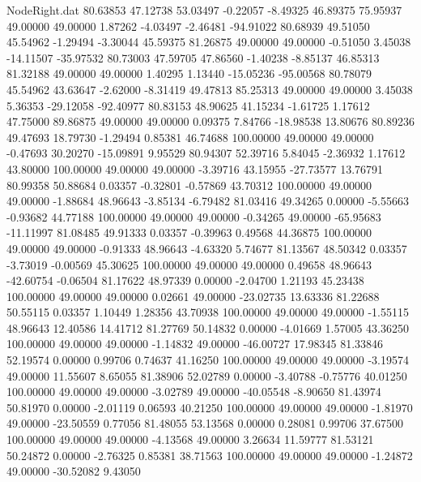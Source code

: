 \begin{filecontents}{NodeRight.dat}
  80.63853   47.12738   53.03497    -0.22057   -8.49325   46.89375   75.95937   49.00000   49.00000    1.87262   -4.03497   -2.46481  -94.91022
  80.68939   49.51050   45.54962    -1.29494   -3.30044   45.59375   81.26875   49.00000   49.00000   -0.51050    3.45038  -14.11507  -35.97532
  80.73003   47.59705   47.86560    -1.40238   -8.85137   46.85313   81.32188   49.00000   49.00000    1.40295    1.13440  -15.05236  -95.00568
  80.78079   45.54962   43.63647    -2.62000   -8.31419   49.47813   85.25313   49.00000   49.00000    3.45038    5.36353  -29.12058  -92.40977
  80.83153   48.90625   41.15234    -1.61725    1.17612   47.75000   89.86875   49.00000   49.00000    0.09375    7.84766  -18.98538   13.80676
  80.89236   49.47693   18.79730    -1.29494    0.85381   46.74688  100.00000   49.00000   49.00000   -0.47693   30.20270  -15.09891    9.95529
  80.94307   52.39716    5.84045    -2.36932    1.17612   43.80000  100.00000   49.00000   49.00000   -3.39716   43.15955  -27.73577   13.76791
  80.99358   50.88684    0.03357    -0.32801   -0.57869   43.70312  100.00000   49.00000   49.00000   -1.88684   48.96643   -3.85134   -6.79482
  81.03416   49.34265    0.00000    -5.55663   -0.93682   44.77188  100.00000   49.00000   49.00000   -0.34265   49.00000  -65.95683  -11.11997
  81.08485   49.91333    0.03357    -0.39963    0.49568   44.36875  100.00000   49.00000   49.00000   -0.91333   48.96643   -4.63320    5.74677
  81.13567   48.50342    0.03357    -3.73019   -0.00569   45.30625  100.00000   49.00000   49.00000    0.49658   48.96643  -42.60754   -0.06504
  81.17622   48.97339    0.00000    -2.04700    1.21193   45.23438  100.00000   49.00000   49.00000    0.02661   49.00000  -23.02735   13.63336
  81.22688   50.55115    0.03357     1.10449    1.28356   43.70938  100.00000   49.00000   49.00000   -1.55115   48.96643   12.40586   14.41712
  81.27769   50.14832    0.00000    -4.01669    1.57005   43.36250  100.00000   49.00000   49.00000   -1.14832   49.00000  -46.00727   17.98345
  81.33846   52.19574    0.00000     0.99706    0.74637   41.16250  100.00000   49.00000   49.00000   -3.19574   49.00000   11.55607    8.65055
  81.38906   52.02789    0.00000    -3.40788   -0.75776   40.01250  100.00000   49.00000   49.00000   -3.02789   49.00000  -40.05548   -8.90650
  81.43974   50.81970    0.00000    -2.01119    0.06593   40.21250  100.00000   49.00000   49.00000   -1.81970   49.00000  -23.50559    0.77056
  81.48055   53.13568    0.00000     0.28081    0.99706   37.67500  100.00000   49.00000   49.00000   -4.13568   49.00000    3.26634   11.59777
  81.53121   50.24872    0.00000    -2.76325    0.85381   38.71563  100.00000   49.00000   49.00000   -1.24872   49.00000  -30.52082    9.43050

\end{filecontents}

